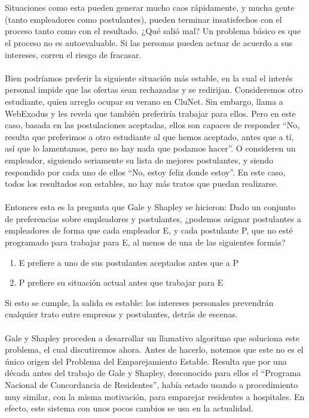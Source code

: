 \documentclass[a4paper]{article}
\begin{document}
\\
\\
	Situaciones como esta pueden generar mucho caos rápidamente, y mucha gente (tanto empleadores como postulantes), pueden terminar insatisfechos con el proceso tanto como con el resultado. ¿Qué salió mal? Un problema básico es que el proceso no es autoevaluable. Si las personas pueden actuar de acuerdo a sus intereses, corren el riesgo de fracasar.
\\
\\
	Bien podríamos preferir la siguiente situación más estable, en la cual el interés personal impide que las ofertas sean rechazadas y se redirijan. Consideremos otro estudiante, quien arreglo ocupar su verano en CluNet. Sin embargo, llama a WebExodus y les revela que también preferiría trabajar para ellos.	Pero en este caso, basada en las postulaciones aceptadas, ellos son capaces de responder “No, resulta que preferimos a otro estudiante al que hemos aceptado, antes que a tí, así que lo lamentamos, pero no hay nada que podamos hacer”. O consideren un empleador, siguiendo seriamente su lista de mejores postulantes, y siendo respondido por cada uno de ellos “No, estoy feliz donde estoy”. En este caso, todos los resultados son estables, no hay más tratos que puedan realizarse.
\\
\\
	Entonces esta es la pregunta que Gale y Shapley se hicieron: Dado un conjunto de preferencias sobre empleadores y postulantes, ¿podemos asignar postulantes a empleadores de forma que cada empleador E, y cada postulante P, que no esté programado para trabajar para E, al menos de una de las siguientes formás?
    \begin{enumerate}
       \item E prefiere a uno de sus postulantes aceptados antes que a P
       \item  P prefiere su situación actual antes que trabajar para E
    \end{enumerate}
Si esto se cumple, la salida es estable: los intereses personales prevendrán cualquier trato entre empresas y postulantes, detrás de escenas.
	\\
    \\
	Gale y Shapley proceden a desarrollar un llamativo algoritmo que soluciona este problema, el cual discutiremos ahora. Antes de hacerlo, notemos que este no es el único origen del Problema del Emparejamiento Estable. Resulta que por una década antes del trabajo de Gale y Shapley, desconocido para ellos el “Programa Nacional de Concordancia de Residentes”, había estado usando a procedimiento muy similar, con la misma motivación, para emparejar residentes a hospitales. En efecto, este sistema con unos pocos cambios se usa en la actualidad.
\end{document}
